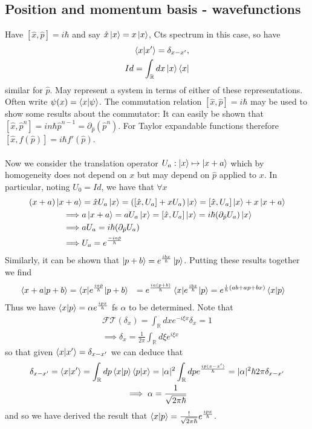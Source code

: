\documentclass{article}
\begin{document}
\subsection{Position and momentum basis - wavefunctions}
Have $[\hat x,\hat p]=i\hbar$ and say $\hat x\ket x=x\ket x$,  Cts spectrum in this case, so have
\begin{align*}
  \braket{x|x'}=\delta_{x-x'},
  \\
  Id=\int_\mathbb{R}dx\ket x \bra x
\end{align*}
similar for $\hat p$.  May represent a system in terms of either of these representations.  Often write $\psi(x)=\braket{x|\psi}$.  The commutation relation $[\hat x,\hat p]=i\hbar$ may be used to show some results about the commutator:  It can easily be shown that $[\hat x,\hat p^n]=in\hbar \hat p^{n-1}=\partial_{\hat p}(\hat p^n)$.  For Taylor expandable functions therefore $[\hat x,f(\hat p)]=i\hbar f'(\hat p)$.
\\
\\
Now we consider the translation operator $U_a:\ket x\mapsto\ket{x+a}$ which by homogeneity does not depend on $x$ but may depend on $\hat p$ applied to $x$.  In particular, noting $U_0=Id$, we have that $\forall x$
\begin{align*}
  (x+a)\ket{x+a}&=\hat xU_a\ket x=([\hat x,U_a]+xU_a)\ket x=[\hat x,U_a]\ket x+x\ket{x+a}
  \\
  \implies& a\ket{x+a}=aU_a\ket x=[\hat x,U_a]\ket x=i\hbar(\partial_{\hat p}U_a)\ket x
  \\
  \implies& aU_a=i\hbar(\partial_{\hat p}U_a)
  \\
  \implies& U_a=e^{\frac{-ia\hat p}{\hbar}}
\end{align*}
Similarly, it can be shown that $\ket{p+b}=e^{\frac{ibx}{\hbar}}\ket{p}$.  Putting these results together we find
\begin{align*}
  \braket{x+a|p+b}&=\braket{x|e^{\frac{ia\hat p}{\hbar}}|p+b}
  &=e^{\frac{ia(p+b)}{\hbar}}\braket{x|e^{\frac{ib\hat x}{\hbar}}|p}
  &=e^{\frac{i}{\hbar}(ab+ap+bx)}\braket{x|p}
\end{align*}
Thus we have $\braket{x|p}=\alpha e^{\frac{ipx}{\hbar}}$ fs $\alpha$ to be determined.  Note that
\begin{gather*}
  \mathcal{FT}(\delta_x)=\int_{\mathbb{R}}dxe^{-i\xi x}\delta_x=1
  \\
  \implies \delta_x=\frac{1}{2\pi}\int_{\mathbb{R}}d\xi e^{i\xi x}
\end{gather*}
so that given $\braket{x|x'}=\delta_{x-x'}$ we can deduce that
\begin{gather*}
  \delta_{x-x'}=\braket{x|x'}=\int_{\mathbb{R}}dp\braket{x|p}\braket{p|x}=|\alpha|^2\int_{\mathbb R}dpe^{\frac{ip(x-x')}{\hbar}}=|\alpha|^2\hbar2\pi\delta_{x-x'}
  \\
  \implies \alpha=\frac{1}{\sqrt{2\pi\hbar}}
\end{gather*}
and so we have derived the result that $\braket{x|p}=\frac{!}{\sqrt{2\pi\hbar}}e^{\frac{ipx}{\hbar}}$.
\end{document}

